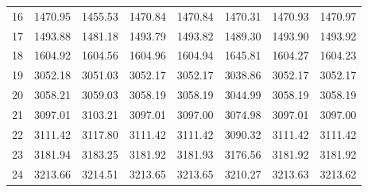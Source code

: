 \documentclass[10pt,oneside]{article}
\begin{document}
\begin{table}[h!]
\begin{tabular}{cccccccc}
16 &   1470.95 & 1455.53 & 1470.84 & 1470.84 &      1470.31 & 1470.93 & 1470.97 \\
17 &   1493.88 & 1481.18 & 1493.79 & 1493.82 &      1489.30 & 1493.90 & 1493.92 \\
18 &   1604.92 & 1604.56 & 1604.96 & 1604.94 &      1645.81 & 1604.27 & 1604.23 \\
19 &   3052.18 & 3051.03 & 3052.17 & 3052.17 &      3038.86 & 3052.17 & 3052.17 \\
20 &   3058.21 & 3059.03 & 3058.19 & 3058.19 &      3044.99 & 3058.19 & 3058.19 \\
21 &   3097.01 & 3103.21 & 3097.01 & 3097.00 &      3074.98 & 3097.01 & 3097.00 \\
22 &   3111.42 & 3117.80 & 3111.42 & 3111.42 &      3090.32 & 3111.42 & 3111.42 \\
23 &   3181.94 & 3183.25 & 3181.92 & 3181.93 &      3176.56 & 3181.92 & 3181.92 \\
24 &   3213.66 & 3214.51 & 3213.65 & 3213.65 &      3210.27 & 3213.63 & 3213.62 \\
\bottomrule
\end{tabular}
\end{table}

\clearpage
\end{document}
